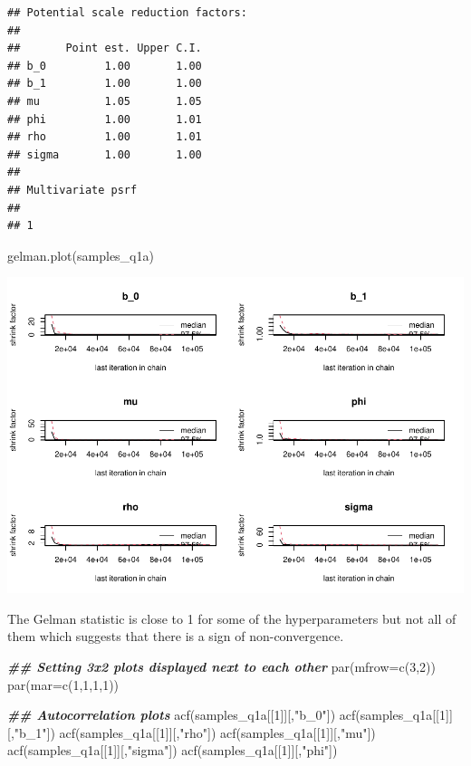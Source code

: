 \documentclass[
]{article}
\newenvironment{Shaded}{\begin{snugshade}}{\end{snugshade}}
\newcommand{\AttributeTok}[1]{\textcolor[rgb]{0.77,0.63,0.00}{#1}}
\newcommand{\DecValTok}[1]{\textcolor[rgb]{0.00,0.00,0.81}{#1}}
\newcommand{\DocumentationTok}[1]{\textcolor[rgb]{0.56,0.35,0.01}{\textbf{\textit{#1}}}}
\newcommand{\FunctionTok}[1]{\textcolor[rgb]{0.00,0.00,0.00}{#1}}
\newcommand{\NormalTok}[1]{#1}
\newcommand{\StringTok}[1]{\textcolor[rgb]{0.31,0.60,0.02}{#1}}
\begin{document}
\begin{verbatim}
## Potential scale reduction factors:
## 
##       Point est. Upper C.I.
## b_0         1.00       1.00
## b_1         1.00       1.00
## mu          1.05       1.05
## phi         1.00       1.01
## rho         1.00       1.01
## sigma       1.00       1.00
## 
## Multivariate psrf
## 
## 1
\end{verbatim}

\begin{Shaded}
\begin{Highlighting}[]
\FunctionTok{gelman.plot}\NormalTok{(samples\_q1a)}
\end{Highlighting}
\end{Shaded}

\includegraphics{assignment-1_files/figure-latex/unnamed-chunk-8-1.pdf}

The Gelman statistic is close to 1 for some of the hyperparameters but
not all of them which suggests that there is a sign of non-convergence.

\begin{Shaded}
\begin{Highlighting}[]
\DocumentationTok{\#\# Setting 3x2 plots displayed next to each other}
\FunctionTok{par}\NormalTok{(}\AttributeTok{mfrow=}\FunctionTok{c}\NormalTok{(}\DecValTok{3}\NormalTok{,}\DecValTok{2}\NormalTok{))}
\FunctionTok{par}\NormalTok{(}\AttributeTok{mar=}\FunctionTok{c}\NormalTok{(}\DecValTok{1}\NormalTok{,}\DecValTok{1}\NormalTok{,}\DecValTok{1}\NormalTok{,}\DecValTok{1}\NormalTok{))}

\DocumentationTok{\#\# Autocorrelation plots}
\FunctionTok{acf}\NormalTok{(samples\_q1a[[}\DecValTok{1}\NormalTok{]][,}\StringTok{"b\_0"}\NormalTok{])}
\FunctionTok{acf}\NormalTok{(samples\_q1a[[}\DecValTok{1}\NormalTok{]][,}\StringTok{"b\_1"}\NormalTok{])}
\FunctionTok{acf}\NormalTok{(samples\_q1a[[}\DecValTok{1}\NormalTok{]][,}\StringTok{"rho"}\NormalTok{])}
\FunctionTok{acf}\NormalTok{(samples\_q1a[[}\DecValTok{1}\NormalTok{]][,}\StringTok{"mu"}\NormalTok{])}
\FunctionTok{acf}\NormalTok{(samples\_q1a[[}\DecValTok{1}\NormalTok{]][,}\StringTok{"sigma"}\NormalTok{])}
\FunctionTok{acf}\NormalTok{(samples\_q1a[[}\DecValTok{1}\NormalTok{]][,}\StringTok{"phi"}\NormalTok{])}
\end{Highlighting}
\end{Shaded}
\end{document}
